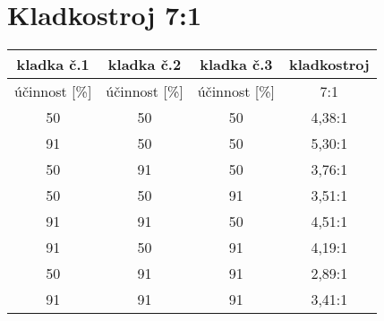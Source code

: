 \section{Kladkostroj 7:1}

\begin{table}[h!]
    \begin{tabular}{|c|c|c|c|}
        \hline
        kladka č.1 & kladka č.2 & kladka č.3 & kladkostroj \\ \hline
        {účinnost [}\%{]}   & {účinnost [}\%{]}   & {účinnost [}\%{]}   & 7:1         \\ \hline
        50                  & 50                  & 50                  & 4,38:1      \\ \hline
        91                  & 50                  & 50                  & 5,30:1      \\ \hline
        50                  & 91                  & 50                  & 3,76:1      \\ \hline
        50                  & 50                  & 91                  & 3,51:1      \\ \hline
        91                  & 91                  & 50                  & 4,51:1      \\ \hline
        91                  & 50                  & 91                  & 4,19:1      \\ \hline
        50                  & 91                  & 91                  & 2,89:1      \\ \hline
        91                  & 91                  & 91                  & 3,41:1      \\ \hline
    \end{tabular}
\end{table}